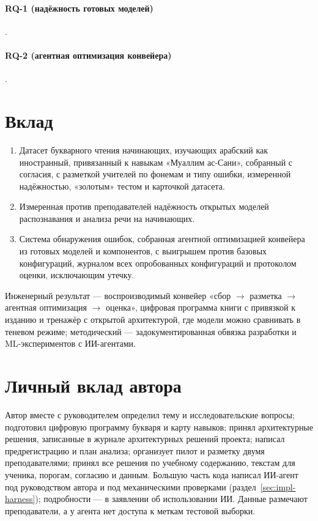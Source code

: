\paragraph{RQ-1 (надёжность готовых моделей)} .
\paragraph{RQ-2 (агентная оптимизация конвейера)} .


\section{Вклад}

\begin{enumerate}
  \item[\textbf{C1.}] Датасет букварного чтения начинающих, изучающих арабский как иностранный, привязанный к
    навыкам «Муаллим ас-Сани», собранный с согласия, с разметкой учителей по фонемам и типу ошибки, измеренной
    надёжностью, «золотым» тестом и карточкой датасета.
  \item[\textbf{C2.}] Измеренная против преподавателей надёжность открытых моделей распознавания и анализа речи
    на начинающих.
  \item[\textbf{C3.}] Система обнаружения ошибок, собранная агентной оптимизацией конвейера из готовых моделей и компонентов, с выигрышем против базовых конфигураций, журналом всех опробованных конфигураций и протоколом
    оценки, исключающим утечку.

\end{enumerate}

Инженерный результат --- воспроизводимый конвейер «сбор $\to$ разметка $\to$ агентная оптимизация $\to$ оценка», цифровая
программа книги с привязкой к изданию и тренажёр с открытой архитектурой, где модели можно сравнивать в
теневом режиме; методический --- задокументированная обвязка разработки и ML-экспериментов с ИИ-агентами.

\section{Личный вклад автора}\label{sec:concl-author}

Автор вместе с руководителем определил тему и исследовательские вопросы; подготовил цифровую программу букваря
и карту навыков; принял архитектурные решения, записанные в журнале архитектурных решений проекта; написал
предрегистрацию и план анализа; организует пилот и разметку двумя преподавателями; принял все решения по
учебному содержанию, текстам для ученика, порогам, согласию и данным. Большую часть кода написал ИИ-агент под
руководством автора и под механическими проверками (раздел~\ref{sec:impl-harness}); подробности --- в заявлении
об использовании ИИ. Данные размечают преподаватели, а у агента нет доступа к меткам тестовой выборки.

